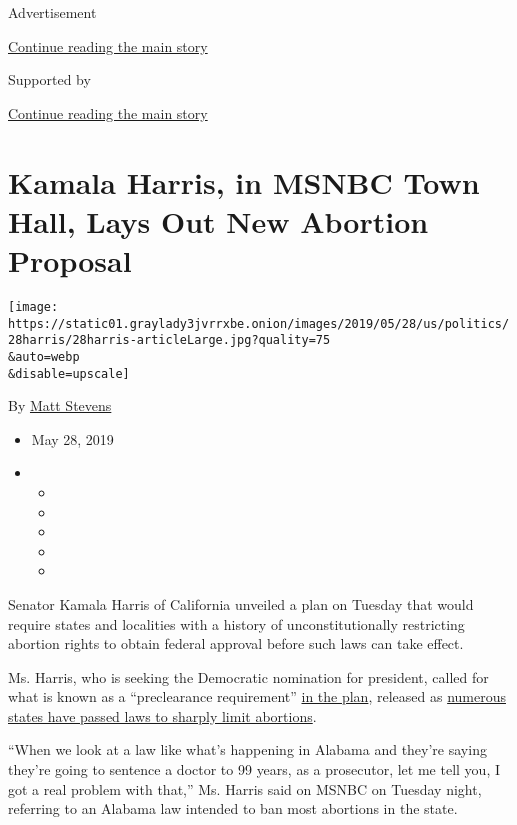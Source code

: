 Advertisement

\protect\hyperlink{after-top}{Continue reading the main story}

Supported by

\protect\hyperlink{after-sponsor}{Continue reading the main story}

\hypertarget{kamala-harris-in-msnbc-town-hall-lays-out-new-abortion-proposal}{%
\section{Kamala Harris, in MSNBC Town Hall, Lays Out New Abortion
Proposal}\label{kamala-harris-in-msnbc-town-hall-lays-out-new-abortion-proposal}}

\texttt{[image: https://static01.graylady3jvrrxbe.onion/images/2019/05/28/us/politics/28harris/28harris-articleLarge.jpg?quality=75\\\&auto=webp\\\&disable=upscale]}

By \href{https://www.nytimes3xbfgragh.onion/by/matt-stevens}{Matt
Stevens}

\begin{itemize}
\item
  May 28, 2019
\item
  \begin{itemize}
  \item
  \item
  \item
  \item
  \item
  \end{itemize}
\end{itemize}

Senator Kamala Harris of California unveiled a plan on Tuesday that
would require states and localities with a history of unconstitutionally
restricting abortion rights to obtain federal approval before such laws
can take effect.

Ms. Harris, who is seeking the Democratic nomination for president,
called for what is known as a ``preclearance requirement''
\href{https://kamalaharris.org/repro-rights/}{in the plan}, released as
\href{https://www.nytimes3xbfgragh.onion/interactive/2019/us/abortion-laws-states.html}{numerous
states have passed laws to sharply limit abortions}.

``When we look at a law like what's happening in Alabama and they're
saying they're going to sentence a doctor to 99 years, as a prosecutor,
let me tell you, I got a real problem with that,'' Ms. Harris said on
MSNBC on Tuesday night, referring to an Alabama law intended to ban most
abortions in the state.

